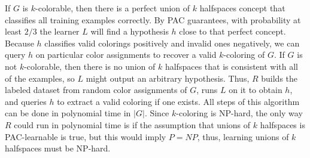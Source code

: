 \documentclass[11pt]{article}
\DeclareMathOperator{\1}{\mathbbm{1}}
\begin{document}
If $G$ is $k$-colorable, then there is a perfect union of $k$ halfspaces concept that classifies all training examples correctly. By PAC guarantees, with probability at least $2/3$ the learner $L$ will find a hypothesis $h$ close to that perfect concept. Because $h$ classifies valid colorings positively and invalid ones negatively, we can query $h$ on particular color assignments to recover a valid $k$-coloring of $G$. If $G$ is not $k$-colorable, then there is no union of $k$ halfspaces that is consistent with all of the examples, so $L$ might output an arbitrary hypothesis. Thus, $R$ builds the labeled dataset from random color assignments of $G$, runs $L$ on it to obtain $h$, and queries $h$ to extract a valid coloring if one exists. All steps of this algorithm can be done in polynomial time in $|G|$. Since $k$-coloring is NP-hard, the only way $R$ could run in polynomial time is if the assumption that unions of $k$ halfspaces is PAC-learnable is true, but this would imply $P=NP$, thus, learning unions of $k$ halfspaces must be NP-hard.


\end{document}
